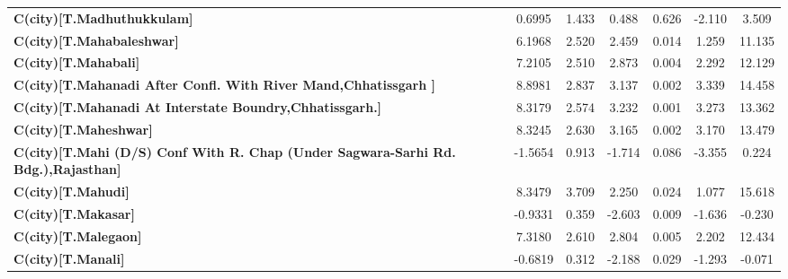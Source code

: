 \begin{center}
\begin{tabular}{lcccccc}
\textbf{C(city)[T.Madhuthukkulam]}                                                                  &       0.6995  &        1.433     &     0.488  &         0.626        &       -2.110    &        3.509     \\
\textbf{C(city)[T.Mahabaleshwar]}                                                                   &       6.1968  &        2.520     &     2.459  &         0.014        &        1.259    &       11.135     \\
\textbf{C(city)[T.Mahabali]}                                                                        &       7.2105  &        2.510     &     2.873  &         0.004        &        2.292    &       12.129     \\
\textbf{C(city)[T.Mahanadi After Confl. With River Mand,Chhatissgarh ]}                             &       8.8981  &        2.837     &     3.137  &         0.002        &        3.339    &       14.458     \\
\textbf{C(city)[T.Mahanadi At Interstate Boundry,Chhatissgarh.]}                                    &       8.3179  &        2.574     &     3.232  &         0.001        &        3.273    &       13.362     \\
\textbf{C(city)[T.Maheshwar]}                                                                       &       8.3245  &        2.630     &     3.165  &         0.002        &        3.170    &       13.479     \\
\textbf{C(city)[T.Mahi (D/S) Conf With R. Chap (Under Sagwara-Sarhi Rd. Bdg.),Rajasthan]}           &      -1.5654  &        0.913     &    -1.714  &         0.086        &       -3.355    &        0.224     \\
\textbf{C(city)[T.Mahudi]}                                                                          &       8.3479  &        3.709     &     2.250  &         0.024        &        1.077    &       15.618     \\
\textbf{C(city)[T.Makasar]}                                                                         &      -0.9331  &        0.359     &    -2.603  &         0.009        &       -1.636    &       -0.230     \\
\textbf{C(city)[T.Malegaon]}                                                                        &       7.3180  &        2.610     &     2.804  &         0.005        &        2.202    &       12.434     \\
\textbf{C(city)[T.Manali]}                                                                          &      -0.6819  &        0.312     &    -2.188  &         0.029        &       -1.293    &       -0.071     \\

\end{tabular}
\end{center}
